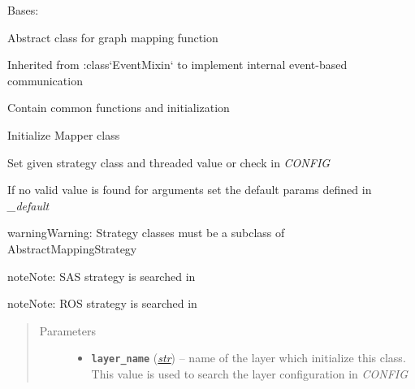 \documentclass[letterpaper,10pt,english]{sphinxmanual}
\begin{document}

\begin{fulllineitems}
\label{util/mapping:escape.util.mapping.AbstractMapper}
Bases: 

Abstract class for graph mapping function

Inherited from :class{}`EventMixin{}` to implement internal event-based
communication

Contain common functions and initialization

\begin{fulllineitems}
\label{util/mapping:escape.util.mapping.AbstractMapper._defaults}
\end{fulllineitems}


\begin{fulllineitems}
\label{util/mapping:escape.util.mapping.AbstractMapper.__init__}
Initialize Mapper class

Set given strategy class and threaded value or check in \emph{CONFIG}

If no valid value is found for arguments set the default params defined
in \emph{\_default}

\begin{notice}{warning}{Warning:}
Strategy classes must be a subclass of AbstractMappingStrategy
\end{notice}

\begin{notice}{note}{Note:}
SAS strategy is searched in {\hyperref[service/sas_mapping:module-escape.service.sas_mapping]{\emph{}}}
\end{notice}

\begin{notice}{note}{Note:}
ROS strategy is searched in {\hyperref[orchest/ros_mapping:module-escape.orchest.ros_mapping]{\emph{}}}
\end{notice}
\begin{quote}\begin{description}
\item[{Parameters}] \leavevmode\begin{itemize}
\item {} 
\textbf{\texttt{layer\_name}} (\href{https://docs.python.org/2.7/library/functions.html\#str}{\emph{str}}) -- name of the layer which initialize this class. This
value is used to search the layer configuration in \emph{CONFIG}


\end{itemize}
\end{description}
\end{quote}
\end{fulllineitems}
\end{fulllineitems}
\end{document}

